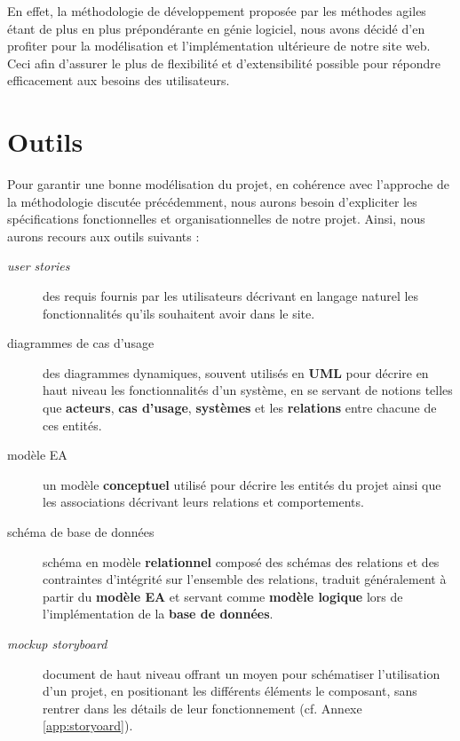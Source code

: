 \documentclass[a4paper,12pt]{report}
\theoremstyle{break}
\theoremstyle{break}
\theoremstyle{break}
\theoremstyle{break}
\theoremstyle{definition}
\theoremstyle{remark}
\begin{document}
En effet, la méthodologie de développement proposée par les méthodes agiles étant de plus en plus prépondérante en génie logiciel, nous avons décidé d'en profiter pour la modélisation et l'implémentation ultérieure de notre site web. Ceci afin d'assurer le plus de flexibilité et d'extensibilité possible pour répondre efficacement aux besoins des utilisateurs.
\section{Outils}
Pour garantir une bonne modélisation du projet, en cohérence avec l'approche de la méthodologie discutée précédemment, nous aurons besoin d'expliciter les spécifications fonctionnelles et organisationnelles de notre projet. Ainsi, nous aurons recours aux outils suivants :
\begin{description}
  \item[\textit{user stories}]{des requis fournis par les utilisateurs décrivant en langage naturel les fonctionnalités qu'ils souhaitent avoir dans le site.}
  \item[diagrammes de cas d'usage]{des diagrammes dynamiques, souvent utilisés en \textbf{UML} pour décrire en haut niveau les fonctionnalités d'un système, en se servant de notions telles que \textbf{acteurs}, \textbf{cas d'usage}, \textbf{systèmes} et les \textbf{relations} entre chacune de ces entités.}
  \item[modèle EA]{un modèle \textbf{conceptuel} utilisé pour décrire les entités du projet ainsi que les associations décrivant leurs relations et comportements.}
  \item[schéma de base de données]{schéma en modèle \textbf{relationnel} composé des schémas des relations et des contraintes d'intégrité sur l'ensemble des relations, traduit généralement à partir du \textbf{modèle EA} et servant comme \textbf{modèle logique} lors de l'implémentation de la \textbf{base de données}.}
  \item[\textit{mockup storyboard}]{document de haut niveau offrant un moyen pour schématiser l'utilisation d'un projet, en positionant les différents éléments le composant, sans rentrer dans les détails de leur fonctionnement (cf. Annexe \ref{app:storyoard}).}
\end{description}
\end{document}
